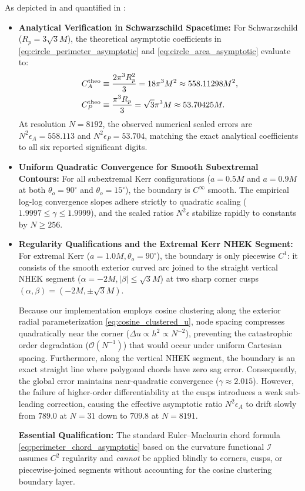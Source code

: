 As depicted in  and quantified in :
\begin{itemize}
    \item \textbf{Analytical Verification in Schwarzschild Spacetime:}  
    For Schwarzschild ($R_p = 3\sqrt{3}M$), the theoretical asymptotic coefficients in \eqref{eq:circle_perimeter_asymptotic} and \eqref{eq:circle_area_asymptotic} evaluate to:
    \begin{align}
        C_A^{\rm theo} &\equiv \frac{2\pi^3 R_p^2}{3} = 18\pi^3 M^2 \approx 558.11298 M^2, \label{eq:ca_theo} \\
        C_P^{\rm theo} &\equiv \frac{\pi^3 R_p}{3} = \sqrt{3}\pi^3 M \approx 53.70425 M. \label{eq:cp_theo}
    \end{align}
    At resolution $N = 8192$, the observed numerical scaled errors are $N^2\epsilon_A = 558.113$ and $N^2\epsilon_P = 53.704$, matching the exact analytical coefficients to all six reported significant digits.
    
    \item \textbf{Uniform Quadratic Convergence for Smooth Subextremal Contours:}  
    For all subextremal Kerr configurations ($a = 0.5M$ and $a = 0.9M$ at both $\theta_o = 90^\circ$ and $\theta_o = 15^\circ$), the boundary is $C^\infty$ smooth. The empirical log-log convergence slopes adhere strictly to quadratic scaling ($1.9997 \le \gamma \le 1.9999$), and the scaled ratios $N^2\epsilon$ stabilize rapidly to constants by $N \ge 256$.
    
    \item \textbf{Regularity Qualifications and the Extremal Kerr NHEK Segment:}  
    For extremal Kerr ($a = 1.0M, \theta_o = 90^\circ$), the boundary is only piecewise $C^1$: it consists of the smooth exterior curved arc joined to the straight vertical NHEK segment ($\alpha = -2M, |\beta| \le \sqrt{3}M$) at two sharp corner cusps $(\alpha, \beta) = (-2M, \pm\sqrt{3}M)$.  
    
    Because our implementation employs cosine clustering along the exterior radial parameterization \eqref{eq:cosine_clustered_u}, node spacing compresses quadratically near the corner ($\Delta u \propto h^2 \propto N^{-2}$), preventing the catastrophic order degradation ($\mathcal{O}(N^{-1})$) that would occur under uniform Cartesian spacing. Furthermore, along the vertical NHEK segment, the boundary is an exact straight line where polygonal chords have zero sag error. Consequently, the global error maintains near-quadratic convergence ($\gamma \approx 2.015$). However, the failure of higher-order differentiability at the cusps introduces a weak sub-leading correction, causing the effective asymptotic ratio $N^2\epsilon_A$ to drift slowly from $789.0$ at $N = 31$ down to $709.8$ at $N = 8191$.  
    
    \noindent \textbf{Essential Qualification:} The standard Euler--Maclaurin chord formula \eqref{eq:perimeter_chord_asymptotic} based on the curvature functional $\mathcal{I}$ assumes $C^2$ regularity and \textit{cannot} be applied blindly to corners, cusps, or piecewise-joined segments without accounting for the cosine clustering boundary layer.
\end{itemize}

